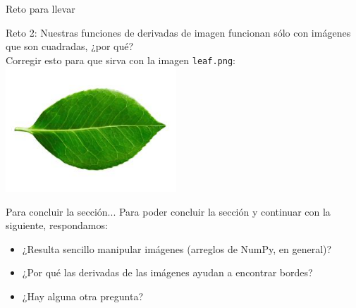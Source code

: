 \documentclass[usenames,dvipsnames]{beamer}
\begin{document}
  \begin{frame}{Reto para llevar}
    \vspace*{0.5cm}
    \begin{block}{Reto 2:}
      Nuestras funciones de derivadas de imagen funcionan sólo con imágenes
      que son cuadradas, ¿por qué?\\
      \vspace*{0.5cm}
      Corregir esto para que sirva con la imagen \texttt{leaf.png}:\\
      \centering
      \includegraphics[width=0.48\textwidth]{../imgs/leaf}
      \vspace*{0.5cm}
    \end{block}
  \end{frame}

  \begin{frame}{Para concluir la sección...}
    Para poder concluir la sección y continuar con la siguiente,
    respondamos:
    \begin{itemize}
      \item ¿Resulta sencillo manipular imágenes (arreglos de NumPy,
      en general)?
      \item ¿Por qué las derivadas de las imágenes ayudan a
      encontrar bordes?
      \item ¿Hay alguna otra pregunta?
    \end{itemize}
  \end{frame}

\end{document}
